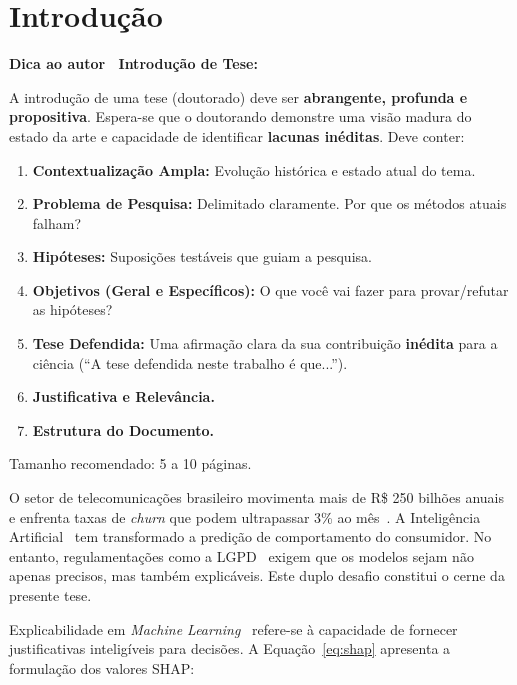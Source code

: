 \documentclass[
    12pt,
    oneside,
    a4paper,
    english,
    brazilian
    ]{abntex2}
\numberwithin{equation}{chapter}
\newenvironment{dica}{%
    \par\medskip
    \color{blue!60!black}\small\itshape
}{%
    \par\medskip
}
\begin{document}
\chapter{Introdução}

\begin{dica}
\noindent\textbf{Dica ao autor \textemdash\ Introdução de Tese:}

A introdução de uma tese (doutorado) deve ser \textbf{abrangente, profunda e propositiva}. Espera-se que o doutorando demonstre uma visão madura do estado da arte e capacidade de identificar \textbf{lacunas inéditas}. Deve conter:
\begin{enumerate}
    \item \textbf{Contextualização Ampla:} Evolução histórica e estado atual do tema.
    \item \textbf{Problema de Pesquisa:} Delimitado claramente. Por que os métodos atuais falham?
    \item \textbf{Hipóteses:} Suposições testáveis que guiam a pesquisa.
    \item \textbf{Objetivos (Geral e Específicos):} O que você vai fazer para provar/refutar as hipóteses?
    \item \textbf{Tese Defendida:} Uma afirmação clara da sua contribuição \textbf{inédita} para a ciência (``A tese defendida neste trabalho é que...'').
    \item \textbf{Justificativa e Relevância.}
    \item \textbf{Estrutura do Documento.}
\end{enumerate}
Tamanho recomendado: 5 a 10 páginas.
\end{dica}

O setor de telecomunicações brasileiro movimenta mais de R\$ 250 bilhões anuais e enfrenta taxas de \textit{churn} que podem ultrapassar 3\% ao mês~\cite{souza2023}. A Inteligência Artificial~\cite{russell2022} tem transformado a predição de comportamento do consumidor. No entanto, regulamentações como a LGPD~\cite{castro2023} exigem que os modelos sejam não apenas precisos, mas também explicáveis. Este duplo desafio constitui o cerne da presente tese.

Explicabilidade em \textit{Machine Learning}~\cite{castro2023} refere-se à capacidade de fornecer justificativas inteligíveis para decisões. A Equação~\ref{eq:shap} apresenta a formulação dos valores SHAP:
\end{document}
